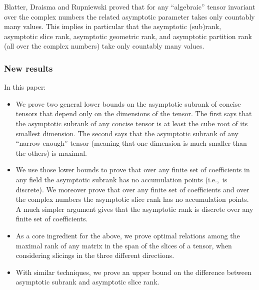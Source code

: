 \documentclass{daj}
\begin{document}
Blatter, Draisma and Rupniewski \cite{https://doi.org/10.48550/arxiv.2212.12219} proved that for any ``algebraic'' tensor invariant over the complex numbers the related asymptotic parameter takes only countably many values. This implies in particular that the asymptotic (sub)rank, asymptotic slice rank, asymptotic geometric rank, and asymptotic partition rank (all over the complex numbers) take only countably many values. 

\subsubsection*{New results}

In this paper:
\begin{itemize}
    \item We prove two general lower bounds on the asymptotic subrank of concise 
    tensors that depend only on the dimensions of the tensor. The first says that the asymptotic subrank of any concise tensor is at least the cube root of its smallest dimension. The second says that the asymptotic subrank of any ``narrow enough'' tensor (meaning that one dimension is much smaller than the others) is maximal.
    \item We use those lower bounds to prove that over any finite set of coefficients in any field the asymptotic subrank has no accumulation points (i.e.,~is discrete). We moreover prove that over any finite set of coefficients and over the complex numbers the asymptotic slice rank has no accumulation points. A much simpler argument gives that the asymptotic rank is discrete over any finite set of coefficients. 
    \item As a core ingredient for the above, we prove optimal relations among the maximal rank of any matrix in the span of the slices of a tensor, when considering slicings in the three different directions.
    \item With similar techniques, we prove an upper bound on the difference between asymptotic subrank and asymptotic slice rank.
\end{itemize}

%

%

%
\end{document}
